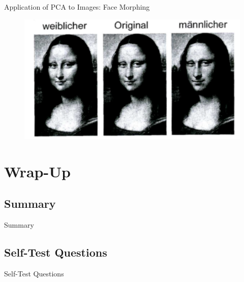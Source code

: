 \begin{frame}{Application of PCA to Images: Face Morphing}{}
	\begin{figure}
		\centering
		\includegraphics[scale=0.35]{13_pca/02_img/face_morphing}
	\end{figure}
\end{frame}


\section{Wrap-Up}

\subsection{Summary}

\begin{frame}{Summary}{}

\end{frame}


\subsection{Self-Test Questions}

\begin{frame}{Self-Test Questions}{}\important

\end{frame}


